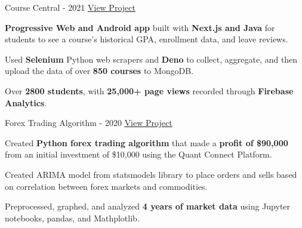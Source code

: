 

\begin{cventries}

  \cventry
    {} %
    {Course Central - 2021} %
    {\href{https://coursecentral.ca/}{\underline{View Project}}} %
    {} %
    {
      \begin{cvitems} %
        \item {\textbf{Progressive Web and Android app} built with \textbf{Next.js and Java} for students to see a course's historical GPA, enrollment data, and leave reviews.}
        \item {Used \textbf{Selenium} Python web scrapers and \textbf{Deno} to collect, aggregate, and then upload the data of over \textbf{850 courses} to MongoDB.}
        \item {Over \textbf{2800 students}, with \textbf{25,000+ page views} recorded through \textbf{Firebase Analytics}.}
      \end{cvitems}
    }

  \cventry
    {} %
    {Forex Trading Algorithm - 2020} %
    {\href{https://github.com/KnlnKS/Forex-Price-Predictor-Quantconnect}{\underline{View Project}}} %
    {} %
    {
      \begin{cvitems} %
        \item {Created \textbf{Python forex trading algorithm} that made a \textbf{profit of \$90,000} from an initial investment of \$10,000 using the Quant Connect Platform.}
        \item {Created ARIMA model from statsmodels library to place orders and sells based on correlation between forex markets and commodities.}
        \item {Preprocessed, graphed, and analyzed \textbf{4 years of market data} using Jupyter notebooks, pandas, and Mathplotlib.}
      \end{cvitems}
    }


\end{cventries}
